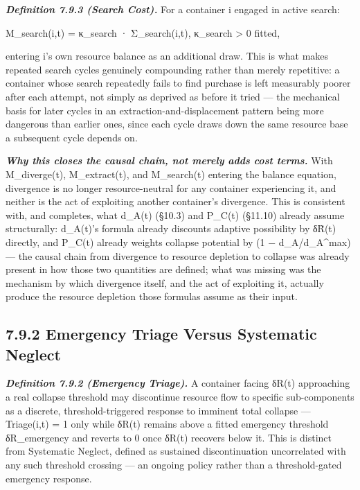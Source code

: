 \documentclass[
]{article}
\begin{document}
\emph{\textbf{Definition 7.9.3 (Search Cost).}} For a container i
engaged in active search:

M\_search(i,t) = κ\_search · Σ\_search(i,t), κ\_search \textgreater{} 0
fitted,

entering i's own resource balance as an additional draw. This is what
makes repeated search cycles genuinely compounding rather than merely
repetitive: a container whose search repeatedly fails to find purchase
is left measurably poorer after each attempt, not simply as deprived as
before it tried --- the mechanical basis for later cycles in an
extraction-and-displacement pattern being more dangerous than earlier
ones, since each cycle draws down the same resource base a subsequent
cycle depends on.

\emph{\textbf{Why this closes the causal chain, not merely adds cost
terms.}} With M\_diverge(t), M\_extract(t), and M\_search(t) entering
the balance equation, divergence is no longer resource-neutral for any
container experiencing it, and neither is the act of exploiting another
container's divergence. This is consistent with, and completes, what
d\_A(t) (§10.3) and P\_C(t) (§11.10) already assume structurally:
d\_A(t)'s formula already discounts adaptive possibility by δR̃(t)
directly, and P\_C(t) already weights collapse potential by (1 −
d\_A/d\_A\^{}max) --- the causal chain from divergence to resource
depletion to collapse was already present in how those two quantities
are defined; what was missing was the mechanism by which divergence
itself, and the act of exploiting it, actually produce the resource
depletion those formulas assume as their input.

\hypertarget{emergency-triage-versus-systematic-neglect}{%
\subsection{7.9.2 Emergency Triage Versus Systematic
Neglect}\label{emergency-triage-versus-systematic-neglect}}

\emph{\textbf{Definition 7.9.2 (Emergency Triage).}} A container facing
δR(t) approaching a real collapse threshold may discontinue resource
flow to specific sub-components as a discrete, threshold-triggered
response to imminent total collapse --- Triage(i,t) = 1 only while δR(t)
remains above a fitted emergency threshold δR\_emergency and reverts to
0 once δR(t) recovers below it. This is distinct from Systematic
Neglect, defined as sustained discontinuation uncorrelated with any such
threshold crossing --- an ongoing policy rather than a threshold-gated
emergency response.
\end{document}
